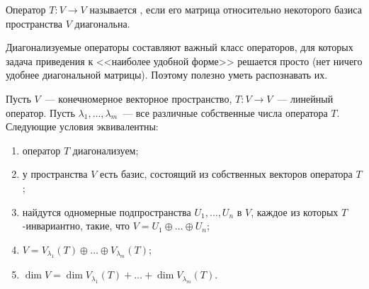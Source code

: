 \begin{definition}
Оператор $T\colon V\to V$ называется ,
если его матрица относительно некоторого базиса пространства $V$
диагональна.
\end{definition}
Диагонализуемые операторы составляют важный класс операторов,
для которых задача приведения к <<наиболее удобной форме>>
решается просто (нет ничего удобнее диагональной матрицы).
Поэтому полезно уметь распознавать их.
\begin{theorem}\label{thm:diagonalizable-equivalent}
Пусть $V$~--- конечномерное векторное пространство,
$T\colon V\to V$~--- линейный оператор. Пусть
$\lambda_1,\dots,\lambda_m$~--- все различные собственные числа
оператора $T$. Следующие условия эквивалентны:
\begin{enumerate}
\item оператор $T$ диагонализуем;\label{thm:diagonalizable-equivalent-1}
\item у пространства $V$ есть базис, состоящий из собственных
векторов оператора $T$;\label{thm:diagonalizable-equivalent-2}
\item найдутся одномерные подпространства $U_1,\dots,U_n$ в $V$,
каждое из которых $T$-инвариантно, такие, что
$V = U_1\oplus\dots\oplus U_n$;\label{thm:diagonalizable-equivalent-3}
\item $V = V_{\lambda_1}(T)\oplus\dots\oplus V_{\lambda_m}(T)$;
\label{thm:diagonalizable-equivalent-4}
\item $\dim V = \dim V_{\lambda_1}(T) + \dots + \dim V_{\lambda_m}(T)$.
\label{thm:diagonalizable-equivalent-5}
\end{enumerate}
\end{theorem}
